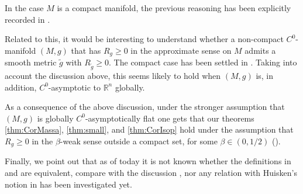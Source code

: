 \documentclass[a4paper,12pt,reqno]{amsart}
\numberwithin{equation}{section}
\theoremstyle{plain}
\theoremstyle{definition}
\theoremstyle{remark}
\begin{document}
  In the case $M$ is a compact manifold, the previous reasoning has been explicitly recorded in \cite[Corollary 1.6]{PaulaGAFA}. {Related to this, it would be interesting to understand whether a non-compact $C^0$-manifold $(M,g)$ that has $R_g\geq 0$ in the approximate sense on $M$ admits a smooth metric $\tilde g$ with $R_{\tilde g}\geq 0$. The compact case has been settled in \cite[Corollary 1.8]{PaulaGAFA}. Taking into account the discussion above, this seems likely to hold when $(M,g)$ is, in addition, $C^0$-asymptotic to $\mathbb R^n$ globally. 

    As a consequence of the above discussion, under the stronger assumption that $(M,g)$ is globally $C^0$-asymptotically flat one gets that our theorems \ref{thm:CorMassa}, \ref{thm:small}, and \ref{thm:CorIsop} hold under the assumption that $R_{g}\geq 0$ in the $\beta$-weak sense outside a compact set, for some $\beta\in (0,1/2)$ (\cite[Definition 2.3]{PaulaADM}). 

    Finally, we point out that as of today it is not known whether the definitions in \cite{GromovScal} and \cite{PaulaGAFA} are equivalent, compare with the discussion \cite[Page 1707-1708]{PaulaGAFA}, nor any relation with Huisken's notion in \cite{Huisken2} has  been investigated yet.  

}
\end{document}
